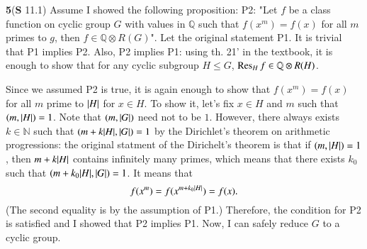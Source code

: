 \documentclass[a4paper, 12pt]{article}
\theoremstyle{Mydefinition}
\theoremstyle{Mytheorem}
\begin{document}
\noindent \textbf{5}(\textbf{S} 11.1)
Assume I showed the following proposition: P2: "Let $f$ be a class function on cyclic group $G$ with values in $\mathbb{Q}$ such that $f(x^m)=f(x)$ for all $m$ primes to $g$, then $f\in \mathbb{Q}\otimes R(G)$". Let the original statement P1. It is trivial that P1 implies P2. Also, P2 implies P1: using th. 21' in the textbook, it is enough to show that for any cyclic subgroup $H\leq G$, $\Res_H f\in \mathbb{Q}\otimes R(H)$. 

Since we assumed P2 is true, it is again enough to show that $f(x^m)=f(x)$ for all $m$ prime to $\abs{H}$ for $x\in H$. To show it, let's fix $x\in H$ and $m$ such that $(m,\abs{H})=1$. Note that $(m,\abs{G})$ need not to be $1$. However, there always exists $k\in\mathbb{N}$ such that $(m+k\abs{H}, \abs{G})=1$ by the Dirichlet's theorem on arithmetic progressions: the original statment of the Dirichelt's theorem is that if $(m,\abs{H})=1$, then $m+k\abs{H}$ contains infinitely many primes, which means that there exists $k_0$ such that $(m+k_0\abs{H},\abs{G})=1$. It means that
\begin{equation}
    f(x^{m}) = f(x^{m+k_0\abs{H}}) = f(x).
\end{equation}
(The second equality is by the assumption of P1.) Therefore, the condition for P2 is satisfied and I showed that P2 implies P1. Now, I can safely reduce $G$ to a cyclic group.
\end{document}
